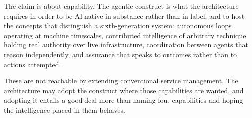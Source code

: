 The claim is about capability. The agentic construct is what the
architecture requires in order to be AI-native in substance rather than
in label, and to host the concepts that distinguish a sixth-generation
system: autonomous loops operating at machine timescales, contributed
intelligence of arbitrary technique holding real authority over live
infrastructure, coordination between agents that reason independently,
and assurance that speaks to outcomes rather than to actions attempted.

These are not reachable by extending conventional service management.
The architecture may adopt the construct where those capabilities are
wanted, and adopting it entails a good deal more than naming four
capabilities and hoping the intelligence placed in them behaves.
